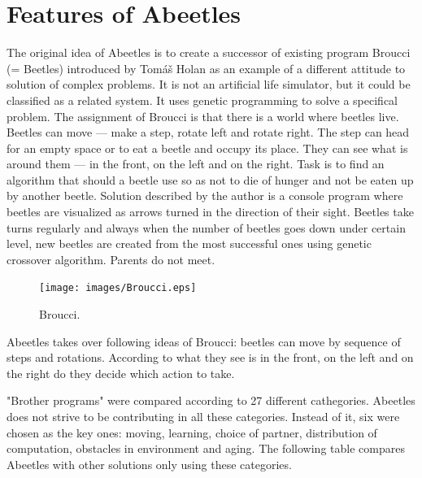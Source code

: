 \documentclass[a4paper,12pt]{report}
\begin{document}
\section{Features of Abeetles}
The original idea of Abeetles is to create a successor of existing program Broucci (= Beetles) introduced by Tom\'{a}\v{s} Holan as an example of a different attitude to solution of complex problems. It is not an artificial life simulator, but it could be classified as a related system. It uses genetic programming to solve a specifical problem. The assignment of Broucci is that there is a world where beetles live. Beetles can move --- make a step, rotate left and rotate right. The step can head for an empty space or to eat a beetle and occupy its place. They can see what is around them --- in the front, on the left and on the right. Task is to find an algorithm that should a beetle use so as not to die of hunger and not be eaten up by another beetle. Solution described by the author is a console program where beetles are visualized as arrows turned in the direction of their sight. Beetles take turns regularly and always when the number of beetles goes down under certain level, new beetles are created from the most successful ones using genetic crossover algorithm. Parents do not meet.\cite{Broucci}

\begin{figure}
\begin{center}
  \texttt{[image: images/Broucci.eps]}
  \caption{Broucci.}
  \label{img.Broucci}
\end{center}
\end{figure}

Abeetles takes over following ideas of Broucci: beetles can move by sequence of steps and rotations. According to what they see is in the front, on the left and on the right do they decide which action to take. 
 

"Brother programs" were compared according to 27 different cathegories. Abeetles does not strive to be contributing in all these categories. Instead of it, six were chosen as the key ones: moving, learning, choice of partner, distribution of computation, obstacles in environment and aging. The following table compares Abeetles with other solutions only using these categories.
\end{document}
